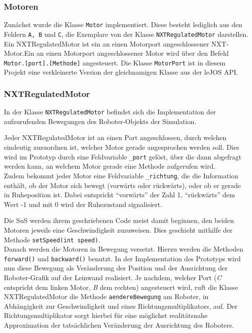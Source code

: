 \documentclass[paper=a4, pagesize, DIV=calc, BCOR=15.5mm, twoside=on, onecolumn=on, open = right, titlepage =on, parskip =half-, headsepline = on, footsepline = on, chapterprefix = on, appendixprefix = off, fontsize = 12pt, numbers = noenddot, abstract = on]{scrbook}
\numberwithin{equation}{chapter}
\theoremstyle{definition}
\theoremstyle{plain}
\theoremstyle{plain}
\theoremstyle{remark}
\theoremstyle{plain}
\theoremstyle{plain}
\begin{document}
\subsubsection{Motoren}
Zunächst wurde die Klasse \texttt{Motor} implementiert. Diese besteht lediglich aus den Feldern \texttt{A, B} und \texttt{C}, die Exemplare von der Klasse \texttt{NXTRegulatedMotor} darstellen. Ein NXTRegulatedMotor ist ein an einen Motorport angeschlossener NXT-Motor.Ein an einen Motorport angeschlossener Motor wird über den Befehl \texttt{Motor.[port].[Methode]} angesteuert. Die Klasse \texttt{MotorPort} ist in diesem Projekt eine verkleinerte Version der gleichnamigen Klasse aus der leJOS API. 

\subsubsection{NXTRegulatedMotor}
In der Klasse \texttt{NXTRegulatedMotor} befindet sich die Implementation der aufzurufenden Bewegungen des Roboter-Objekts der Simulation.

Jeder NXTRegulatedMotor ist an einen Port angeschlossen, durch welchen eindeutig zuzuordnen ist, welcher Motor gerade angesprochen werden soll. Dies wird im Prototyp durch eine Feldvariable \texttt{{\_}port} gelöst, über die dann abgefragt werden kann, an welchem Motor gerade eine Methode aufgerufen wird.\\
Zudem bekommt jeder Motor eine Feldvariable \texttt{{\_}richtung}, die die Information enthält, ob der Motor sich bewegt (vorwärts oder rückwärts), oder ob er gerade in Ruheposition ist. Dabei entspricht "`vorwärts"' der Zahl 1, "`rückwärts"' dem Wert -1 und mit 0 wird der Ruhezustand signalisiert.

Die SuS werden ihrem geschriebenen Code meist damit beginnen, den beiden Motoren jeweils eine Geschwindigkeit zuzuweisen. Dies geschieht mithilfe der Methode \texttt{setSpeed(int speed)}.\\
Danach werden die Motoren in Bewegung versetzt. Hierzu werden die Methoden\\
\texttt{forward()} und \texttt{backward()} benutzt. In der Implementation des Prototyps wird nun diese Bewegung als Veränderung der Position und der Ausrichtung der Roboter-Grafik auf der Leinwand realisiert. Je nachdem, welcher Port (\emph{C} entspricht dem linken Motor, \emph{B} dem rechten) angesteuert wird, ruft die Klasse NXTRegulatedMotor die Methode \texttt{aendereBewegung} am Roboter, in Abhängigkeit zur Geschwindigkeit und eines Richtungsmultiplikators, auf. Der Richtungsmultiplikator sorgt hierbei für eine möglichst realitätsnahe Approximation der tatsächlichen Veränderung der Ausrichtung des Roboters.
\end{document}
